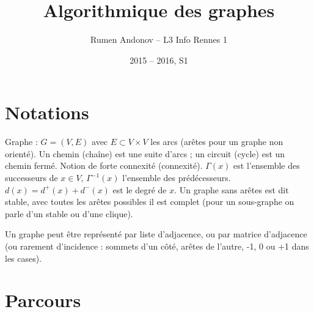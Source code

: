 \documentclass[a4paper]{article}
\title{Algorithmique des graphes}
\author{Rumen Andonov -- L3 Info Rennes 1}
\date{2015 -- 2016, S1}
\begin{document}
\maketitle

\section{Notations}

Graphe : $G=(V,E)$ avec $E\subset V\times V$ les arcs (arêtes pour un graphe non orienté). Un chemin (chaîne) est une suite d'arcs ; un circuit (cycle) est un chemin fermé. Notion de forte connexité (connexité). $\Gamma(x)$ est l'ensemble des successeurs de $x\in V$, $\Gamma^{-1}(x)$ l'ensemble des prédécesseurs. $d(x) = d^+(x) + d^-(x)$ est le degré de $x$. Un graphe sans arêtes est dit stable, avec toutes les arêtes possibles il est complet (pour un sous-graphe on parle d'un stable ou d'une clique).

Un graphe peut être représenté par liste d'adjacence, ou par matrice d'adjacence (ou rarement d'incidence : sommets d'un côté, arêtes de l'autre, -1, 0 ou +1 dans les cases).

\section{Parcours}
\end{document}
